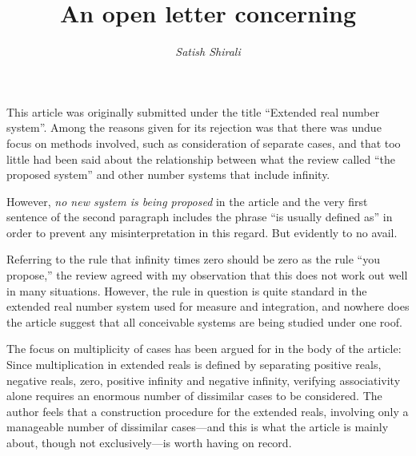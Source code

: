 \documentclass[11pt]{article}
\begin{document}
\title{\bf An open letter concerning \\
\vspace{5mm}{\em   Extended real number system in measure theory
}}
\author{\large\em Satish Shirali}

\date{} %

\maketitle
\thispagestyle{empty}

\noindent This article was originally submitted under the title
``Extended real number system''. Among the reasons given for its
rejection was that there was undue focus on methods involved, such
as consideration of separate cases, and that too little had been
said about the relationship between what the review called ``the
proposed system'' and other number systems that include infinity.\

However, {\em no new system is being proposed} in the article and
the very first sentence of the second paragraph includes the
phrase ``is usually defined as'' in order to prevent any
misinterpretation in this regard. But evidently to no avail.\

Referring to the rule that infinity times zero should be zero as
the rule ``you propose,'' the review agreed with my observation that
this does not work out well in many situations. However, the rule
in question is quite standard in the extended real number system
used for measure and integration, and nowhere does the article
suggest that all conceivable systems are being studied under one
roof.\

\vspace{4mm} The focus on multiplicity of cases has been argued
for in the body of the article: Since multiplication in extended
reals is defined by separating positive reals, negative reals,
zero, positive infinity and negative infinity, verifying
associativity alone requires an enormous number of dissimilar
cases to be considered. The author feels that a construction
procedure for the extended reals, involving only a manageable
number of dissimilar cases---and this is what the article is
mainly about, though not exclusively---is worth having on record.\
\end{document}

